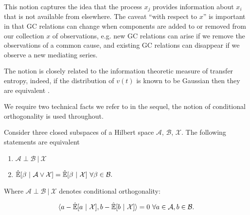 \documentclass[12pt]{article}
\newcommand{\linE}[2]{\hat{\E}[#1\ |\ #2]}  %
\begin{document}
This notion captures the idea that the process $x_j$ provides
information about $x_i$ that is not available from elsewhere.  The
caveat ``with respect to $x$'' is important in that GC relations can
change when components are added to or removed from our collection $x$
of observations, e.g. new GC relations can arise if we remove the
observations of a common cause, and existing GC relations can
disappear if we observe a new mediating series.

The notion is closely related to the information theoretic measure of
transfer entropy, indeed, if the distribution of $v(t)$ is known to be
Gaussian then they are equivalent \cite{barnett2009granger}.

We require two technical facts we refer to in the sequel, the notion
of conditional orthogonality is used throughout.

\begin{lemma}
  \label{lem:conditional_orthogonality_equivalence}
  Consider three closed subspaces of a Hilbert space $\mathcal{A}$,
  $\mathcal{B}$, $\mathcal{X}$.  The following statements are
  equivalent

  \begin{enumerate}
    \item{$\mathcal{A} \perp \mathcal{B}\ |\ \mathcal{X}$}
    \item{$\linE{\beta}{\mathcal{A} \vee \mathcal{X}} = \linE{\beta}{\mathcal{X}}\ \forall \beta \in \mathcal{B}.$}
    \end{enumerate}

    Where $\mathcal{A} \perp \mathcal{B}\ |\ \mathcal{X}$ denotes
    conditional orthogonality:

    \begin{equation*}
      \inner{a - \linE{a}{\mathcal{X}}}{b - \linE{b}{\mathcal{X}}} = 0\ \forall a \in \mathcal{A}, b \in \mathcal{B}.
    \end{equation*}
\end{lemma}
\end{document}
